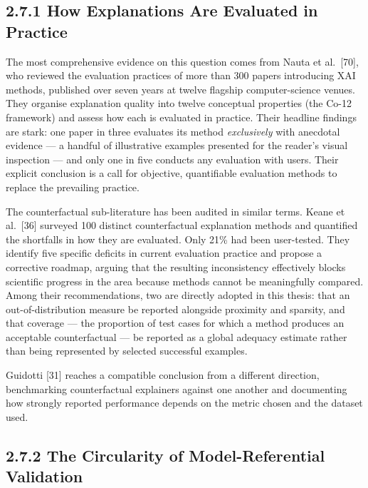 \hypertarget{how-explanations-are-evaluated-in-practice}{%
\subsection{2.7.1 How Explanations Are Evaluated in Practice}\label{how-explanations-are-evaluated-in-practice}}

The most comprehensive evidence on this question comes from Nauta et al.~{[}70{]}, who reviewed the evaluation practices of more than 300 papers introducing XAI methods, published over seven years at twelve flagship computer-science venues. They organise explanation quality into twelve conceptual properties (the Co-12 framework) and assess how each is evaluated in practice. Their headline findings are stark: one paper in three evaluates its method \emph{exclusively} with anecdotal evidence --- a handful of illustrative examples presented for the reader's visual inspection --- and only one in five conducts any evaluation with users. Their explicit conclusion is a call for objective, quantifiable evaluation methods to replace the prevailing practice.

The counterfactual sub-literature has been audited in similar terms. Keane et al.~{[}36{]} surveyed 100 distinct counterfactual explanation methods and quantified the shortfalls in how they are evaluated. Only 21\% had been user-tested. They identify five specific deficits in current evaluation practice and propose a corrective roadmap, arguing that the resulting inconsistency effectively blocks scientific progress in the area because methods cannot be meaningfully compared. Among their recommendations, two are directly adopted in this thesis: that an out-of-distribution measure be reported alongside proximity and sparsity, and that coverage --- the proportion of test cases for which a method produces an acceptable counterfactual --- be reported as a global adequacy estimate rather than being represented by selected successful examples.

Guidotti {[}31{]} reaches a compatible conclusion from a different direction, benchmarking counterfactual explainers against one another and documenting how strongly reported performance depends on the metric chosen and the dataset used.

\hypertarget{the-circularity-of-model-referential-validation}{%
\subsection{2.7.2 The Circularity of Model-Referential Validation}\label{the-circularity-of-model-referential-validation}}

